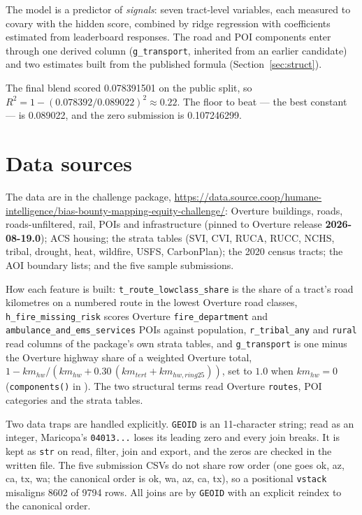\documentclass[a4paper]{article}
\newcommand{\Ftribal}{\texttt{r\_tribal\_any}}
\newcommand{\Frural}{\texttt{rural}}
\newcommand{\Ftrans}{\texttt{g\_transport}}
\newcommand{\Froute}{\texttt{t\_route\_lowclass\_share}}
\newcommand{\Ffire}{\texttt{h\_fire\_missing\_risk}}
\begin{document}
The model is a predictor of \emph{signals}: seven tract-level variables, each measured to covary with the
hidden score, combined by ridge regression with coefficients estimated from leaderboard responses. The
road and POI components enter through one derived column (\Ftrans, inherited from an earlier candidate) and two
estimates built from the published formula (Section~\ref{sec:struct}).

The final blend scored \num{0.078391501} on the public split, so
$R^2 = 1-(0.078392/0.089022)^2 \approx 0.22$. The floor to beat --- the best
constant --- is \num{0.089022}, and the zero submission is \num{0.107246299}.

\section{Data sources}

The data are in the challenge package, \url{https://data.source.coop/humane-intelligence/bias-bounty-mapping-equity-challenge/}: Overture buildings, roads, roads-unfiltered, rail, POIs and infrastructure (pinned to
Overture release \textbf{2026-08-19.0}); ACS housing; the strata tables (SVI, CVI, RUCA,
RUCC, NCHS, tribal, drought, heat, wildfire, USFS, CarbonPlan); the 2020 census tracts; the
AOI boundary lists; and the five sample submissions.

How each feature is built: \Froute{} is the share of a tract's road kilometres on a numbered route in the lowest Overture road classes,
\Ffire{} scores Overture \texttt{fire\_department} and \texttt{ambulance\_and\_ems\_services}
POIs against population, \Ftribal{} and \Frural{} read columns of the package's own strata
tables, and \Ftrans{} is one minus the Overture highway share of a weighted Overture total,
$1-km_{hw}/(km_{hw}+0.30\,(km_{tert}+km_{hw,ring25}))$, set to $1.0$ when $km_{hw}=0$ (\texttt{components()} in
). The two structural terms read Overture \texttt{routes}, POI
categories and the strata tables.

Two data traps are handled explicitly. \texttt{GEOID} is an
11-character string; read as an integer, Maricopa's \texttt{04013...} loses its leading zero
and every join breaks. It is kept as \texttt{str} on read, filter, join and export, and the
zeros are checked in the written file. The five submission CSVs do not share row order (one
goes ok, az, ca, tx, wa; the canonical order is ok, wa, az, ca, tx), so a positional
\texttt{vstack} misaligns \num{8602} of \num{9794} rows. All joins are by \texttt{GEOID} with
an explicit reindex to the canonical order.
\end{document}

